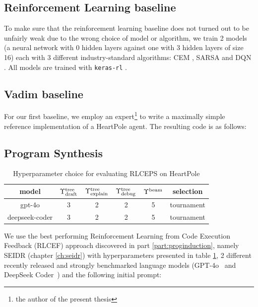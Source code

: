 \subsection{Reinforcement Learning baseline}
To make sure that the reinforcement learning baseline does not turned out to be unfairly weak due to the wrong choice of model or algorithm, we train 2 models (a neural network with 0 hidden layers against one with 3 hidden layers of size 16) each with 3 different industry-standard algorithms: CEM \cite{szitaLearningTetrisUsing2006}, SARSA \cite[Chapter 6]{suttonReinforcementLearningSecond2018} and DQN \cite{mnihPlayingAtariDeep2013,dqn}.
All models are trained with \texttt{keras-rl} \cite{KerasrlKerasrlDeep2025}. 

\subsection{Vadim baseline}

For our first baseline, we employ an expert\footnote{the author of the present thesis} to write a maximally simple reference implementation of a HeartPole agent.
The resulting code is as follows:



\newpage
\subsection{Program Synthesis}

\begin{table}
    \centering
    \begin{tabular}{|c|c|c|c|c|c|}
        model & $\Upsilon^\text{tree}_\text{draft}$ & $\Upsilon^\text{tree}_\text{explain}$ & $\Upsilon^\text{tree}_\text{debug}$ & $\Upsilon^\text{beam}$ & selection \\
        \midrule
        gpt-4o & 3 & 2 & 2 & 5 & tournament \\
        deepseek-coder & 3 & 2 & 2 & 5 & tournament
    \end{tabular}
    \caption{Hyperparameter choice for evaluating RLCEPS on HeartPole}
    \label{tab:rlceps-heartpole}
\end{table}

We use the best performing Reinforcement Learning from Code Execution Feedback (RLCEF) approach discovered in part \ref{part:proginduction}, namely SEIDR (chapter \ref{ch:seidr}) with hyperparameters presented in table \ref{tab:rlceps-heartpole}, 2 different recently released and strongly benchmarked language models (GPT-4o~\cite{openaiGPT4oSystemCard2024} and DeepSeek Coder~\cite{guoDeepSeekCoderWhenLarge2024}) and the following initial prompt: 

